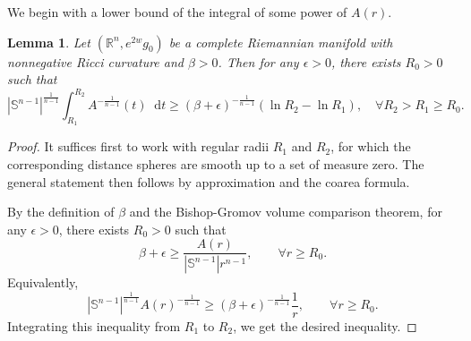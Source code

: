 \documentclass[10pt,a4paper]{amsart}
\newtheorem{lemma}[theorem]{Lemma}
\numberwithin{equation}{section}
\newcommand{\dd}{\mathop{}\!\mathrm{d}}%
\begin{document}
We begin with a lower bound of the integral of some power of $A(r)$.
\begin{lemma}\label{lemma. lower bound of integral of A(r)}
    Let $(\mathbb{R}^n,e^{2w}g_0)$ be a complete Riemannian manifold with nonnegative Ricci curvature and $\beta>0$. Then for any $\epsilon>0$, there exists $R_0>0$ such that
    \[
        |\mathbb{S}^{n-1}|^{\frac{1}{n-1}} 
        \int_{R_1}^{R_2} A^{-\frac{1}{n-1}}(t)\dd t
        \geq (\beta+\epsilon)^{-\frac{1}{n-1}}
        (\ln R_2-\ln R_1),\quad \forall R_2>R_1\geq R_0.
    \]
\end{lemma}
\begin{proof}

It suffices first to work with regular radii $R_1$ and $R_2$,
for which the corresponding distance spheres are smooth up to a
set of measure zero. The general statement then follows by
approximation and the coarea formula.

    By the definition of $\beta$ and the Bishop-Gromov volume comparison theorem, for any $\epsilon>0$, there exists $R_0>0$ such that
    \[
        \beta+\epsilon\geq \frac{A(r)}{|\mathbb{S}^{n-1}|r^{n-1}},\qquad \forall r\geq R_0.
    \]
    Equivalently,
    \[
        |\mathbb{S}^{n-1}|^{\frac{1}{n-1}} 
        A(r)^{-\frac{1}{n-1}}
        \geq (\beta+\epsilon)^{-\frac{1}{n-1}}\frac{1}{r},\qquad \forall r\geq R_0.
    \]
    Integrating this inequality from $R_1$ to $R_2$, we get the desired inequality.
    \end{proof}
    
\end{document}
